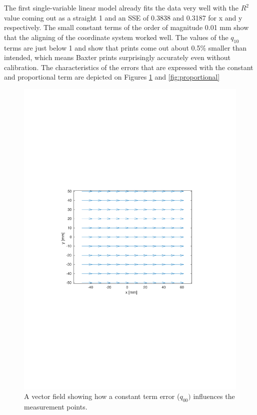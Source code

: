 The first single-variable linear model already fits the data very well with the $R^2$ value coming out as a straight 1 and an SSE of 0.3838 and 0.3187 for x and y respectively. The small constant terms of the order of magnitude 0.01 mm show that the aligning of the coordinate system worked well. The values of the $q_{10}$ terms are just below 1 and show that prints come out about 0.5\% smaller than intended, which means Baxter prints surprisingly accurately even without calibration. The characteristics of the errors that are expressed with the constant and proportional term are depicted on Figures \ref{fig:constant} and \ref{fig:proportional}

\begin{figure}[ht!]
  \centering
  \includegraphics[clip, trim=3.5cm 8cm 3.5cm 8cm, width=0.72\linewidth]{Pictures/constant.pdf}
  \caption{A vector field showing how a constant term error ($q_{00})$  influences the measurement points.}
  \label{fig:constant}
\end{figure}

